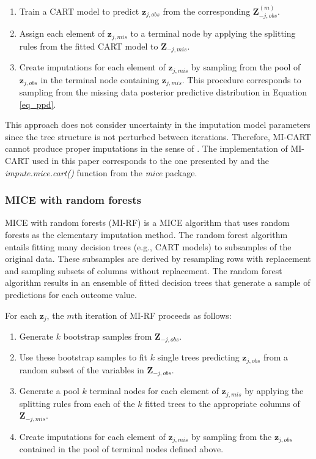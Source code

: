 	\begin{enumerate}
	\item Train a CART model to predict $\bm{z}_{j, obs}$ from the corresponding $\bm{Z}_{-j, obs}^{(m)}$.
	\item Assign each element of $\bm{z}_{j,mis}$ to a terminal node by applying the splitting rules from the fitted CART model to $\bm{Z}_{-j,mis}$.
	\item Create imputations for each element of $\bm{z}_{j,mis}$ by sampling from the pool of $\bm{z}_{j, obs}$ in the terminal node containing $\bm{z}_{j,mis}$. This procedure corresponds to sampling from the missing data posterior predictive distribution in Equation \eqref{eq_ppd}.
	\end{enumerate}
	
	This approach does not consider uncertainty in the imputation model parameters since the tree structure is not perturbed between iterations. Therefore, MI-CART cannot produce proper imputations in the sense of \citet{rubin:1986}. The implementation of MI-CART used in this paper corresponds to the one presented by \citet[][p. 95, algorithm 1]{dooveEtAl:2014} and the \emph{impute.mice.cart()} function from the \emph{mice} package.

\subsubsection{MICE with random forests}
	MICE with random forests (MI-RF) is a MICE algorithm that uses random forests as the elementary imputation method. The random forest algorithm entails fitting many decision trees (e.g., CART models) to subsamples of the original data. These subsamples are derived by resampling rows with replacement and sampling subsets of columns without replacement. The random forest algorithm results in an ensemble of fitted decision trees that generate a sample of predictions for each outcome value. 
	
	For each $\bm{z}_j$, the $m$th iteration of MI-RF proceeds as follows:
		\begin{enumerate}
	    \item Generate $k$ bootstrap samples from $\bm{Z}_{-j,obs}$.
	    \item Use these bootstrap samples to fit $k$ single trees predicting $\bm{z}_{j,obs}$ from a random subset of the variables in $\bm{Z}_{-j,obs}$.
	    \item Generate a pool $k$ terminal nodes for each element of $\bm{z}_{j,mis}$ by applying the splitting rules from each of the $k$ fitted trees to the appropriate columns of $\bm{Z}_{-j,mis}$.
	    \item Create imputations for each element of $\bm{z}_{j,mis}$ by sampling from the $\bm{z}_{j,obs}$ contained in the pool of terminal nodes defined above.
	\end{enumerate}
	 
